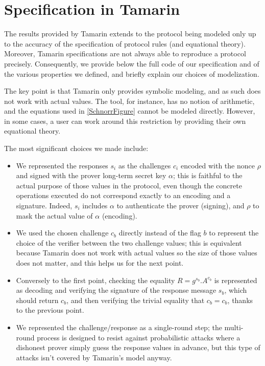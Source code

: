\section{Specification in Tamarin}%
\label{apdx:tamarin-spec}

The results provided by Tamarin extends to the protocol being modeled 
only up to the accuracy of the specification of protocol rules (and equational theory).
Moreover, Tamarin specifications are not always able to reproduce a protocol precisely.
Consequently, we provide below the full code of our specification and of the various properties we defined, and briefly explain our choices of modelization.

The key point is that Tamarin only provides symbolic modeling, and as such does not work with actual values. The tool, for instance, has no notion of arithmetic, and the equations used in \cref{SchnorrFigure} cannot be modeled directly. However, in some cases, a user can work around this restriction by providing their own equational theory.

The most significant choices we made include:
\begin{itemize}
	\item We represented the responses $s_i$ as the challenges $c_i$ encoded with the nonce $\rho$ and signed with the prover long-term secret key $\alpha$; this is faithful to the actual purpose of those values in the protocol, even though the concrete operations executed do not correspond exactly to an encoding and a signature. Indeed, $s_i$ includes $\alpha$ to authenticate the prover (signing), and $\rho$ to mask the actual value of $\alpha$ (encoding).
	\item We used the chosen challenge $c_b$ directly instead of the flag $b$ to represent the choice of the verifier between the two challenge values; this is equivalent because Tamarin does not work with actual values so the size of those values does not matter, and this helps us for the next point.
	\item Conversely to the first point, checking the equality $R = g^{s_b}.A^{c_b}$ is represented as decoding and verifying the signature of the response message $s_b$, which should return $c_b$, and then verifying the trivial equality that $c_b = c_b$, thanks to the previous point.
	\item We represented the challenge/response as a single-round step; the multi-round process is designed to resist against probabilistic attacks where a dishonest prover simply guess the response values in advance, but this type of attacks isn't covered by Tamarin's model anyway.
\end{itemize}

